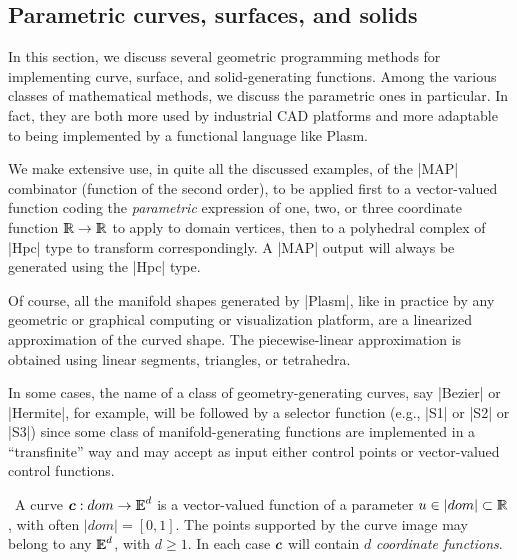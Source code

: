 \begin{coding}[Algebraic computation of FE = $\delta_1$]
{%
\section{ Parametric curves, surfaces, and solids }\label{sect:5-4}

In this section, we discuss several geometric programming methods for implementing curve, surface, and solid-generating functions. Among the various classes of mathematical methods, we discuss the parametric ones in particular. In fact, they are both more used by industrial CAD platforms and more adaptable to being implemented by a functional language like Plasm.

We make extensive use, in quite all the discussed examples, of the |MAP| combinator (function of the second order), to be applied first to a vector-valued function coding the \emph{parametric} expression of one, two, or three coordinate function $\mathbb{I\!\!R} \to \mathbb{I\!\!R}$ to apply to domain vertices, then to a polyhedral complex of |Hpc| type to transform correspondingly. A |MAP| output will always be generated using the |Hpc| type.

Of course, all the manifold shapes generated by |Plasm|, like in practice by any geometric or graphical computing or visualization platform, are a linearized approximation of the curved shape. The piecewise-linear approximation is obtained using linear segments, triangles, or tetrahedra.

\begin{remark}
In some cases, the name of a class of geometry-generating curves, say |Bezier| or |Hermite|, for example, will be followed by a selector function (e.g., |S1| or |S2| or |S3|) since some class of manifold-generating functions are implemented in a “transfinite” way and may accept as input either control points or vector-valued control functions.
\end{remark}


\begin{definition}\ 
A curve ${\mbox{\boldmath $c$}}: dom\to \mathbb{I\!\!E}^d$ is a vector-valued function of a parameter $u\in |dom| \subset \mathbb{I\!\!R}$, with often $|dom| = [0,1]$. The points supported by the curve image may belong to any $\mathbb{I\!\!E}^d$, with $d\geq 1$. In each case ${\mbox{\boldmath $c$}}$ will contain $d$ \emph{coordinate functions}.
\end{definition}

}
\end{coding}
